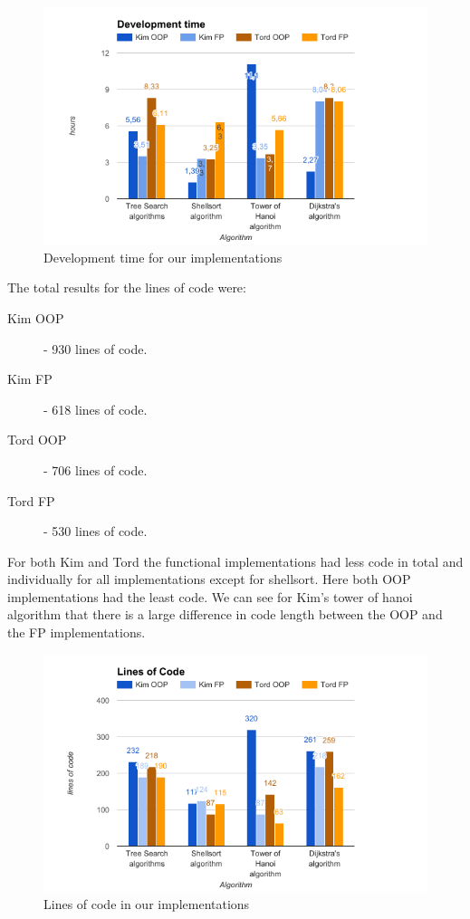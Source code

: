 \documentclass {article}
\begin{document}
\begin{figure}[H]
\includegraphics[width=\textwidth]{development-time-graph}

\caption{Development time for our implementations}
\label{fig:development-time-graph}
\end{figure}

The total results for the lines of code were:
\begin{description}
\item[Kim OOP] - 930 lines of code.
\item[Kim FP] - 618 lines of code.
\item[Tord OOP] - 706 lines of code.
\item[Tord FP] - 530 lines of code.
\end{description}

For both Kim and Tord the functional implementations had less code in total and individually for all implementations except for shellsort. Here both OOP implementations had the least code. We can see for Kim's tower of hanoi algorithm that there is a large difference in code length between the OOP and the FP implementations.

\begin{figure}[H]
\includegraphics[width=\textwidth]{lines-of-code-graph}

\caption{Lines of code in our implementations}
\label{fig:lines-of-code-graph}
\end{figure}
\end{document}
